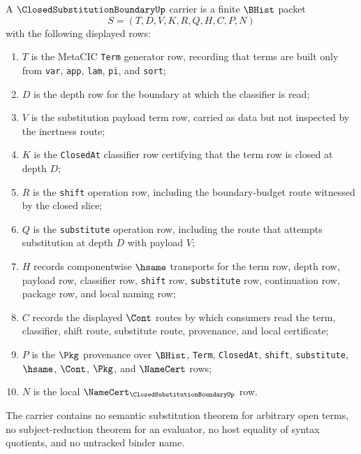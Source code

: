 \begin{definition}
\label{def:closed-substitution-boundary-carrier}
A $\ClosedSubstitutionBoundaryUp$ carrier is a finite $\BHist$ packet
$$
S=(T,D,V,K,R,Q,H,C,P,N)
$$
with the following displayed rows:
\begin{enumerate}
\item $T$ is the MetaCIC \texttt{Term} generator row, recording that terms are built only from \texttt{var}, \texttt{app}, \texttt{lam}, \texttt{pi}, and \texttt{sort};
\item $D$ is the depth row for the boundary at which the classifier is read;
\item $V$ is the substitution payload term row, carried as data but not inspected by the inertness route;
\item $K$ is the \texttt{ClosedAt} classifier row certifying that the term row is closed at depth $D$;
\item $R$ is the \texttt{shift} operation row, including the boundary-budget route witnessed by the closed slice;
\item $Q$ is the \texttt{substitute} operation row, including the route that attempts substitution at depth $D$ with payload $V$;
\item $H$ records componentwise $\hsame$ transports for the term row, depth row, payload row, classifier row, \texttt{shift} row, \texttt{substitute} row, continuation row, package row, and local naming row;
\item $C$ records the displayed $\Cont$ routes by which consumers read the term, classifier, shift route, substitute route, provenance, and local certificate;
\item $P$ is the $\Pkg$ provenance over $\BHist$, \texttt{Term}, \texttt{ClosedAt}, \texttt{shift}, \texttt{substitute}, $\hsame$, $\Cont$, $\Pkg$, and $\NameCert$ rows;
\item $N$ is the local $\NameCert_{\ClosedSubstitutionBoundaryUp}$ row.
\end{enumerate}
The carrier contains no semantic substitution theorem for arbitrary open terms, no subject-reduction theorem for an evaluator, no host equality of syntax quotients, and no untracked binder name.
\end{definition}

